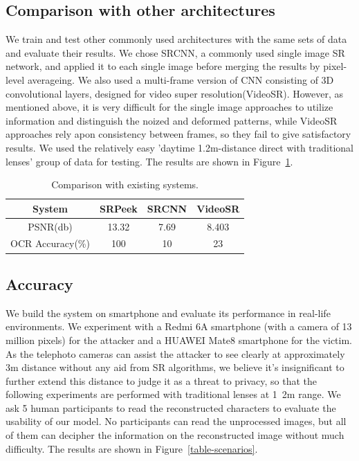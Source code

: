 \subsection{Comparison with other architectures}
We train and test other commonly used architectures with the same sets of data and evaluate their results. We chose SRCNN, a commonly used single image SR network, and applied it to each single image before merging the results by pixel-level averageing. We also used a multi-frame version of CNN consisting of 3D convolutional layers, designed for video super resolution(VideoSR). However, as mentioned above, it is very difficult for the single image approaches to utilize information and distinguish the noized and deformed patterns, while VideoSR approaches rely apon consistency between frames, so they fail to give satisfactory results. We used the relatively easy 'daytime 1.2m-distance direct with traditional lenses' group of data for testing. The results are shown in Figure~\ref{table-comp}.
\begin{table}[!t]
    \centering
    \begin{tabular}{@{}cccc@{}}
        \toprule
    System & SRPeek & SRCNN & VideoSR \\ \midrule
    PSNR(db) & 13.32 & 7.69 & 8.403\\ 
    OCR Accuracy(\%) & 100 & 10 & 23\\ \bottomrule
    \end{tabular}
    \caption{Comparison with existing systems.}
    \label{table-comp}
\end{table}

\subsection{Accuracy}
We build the system on smartphone and evaluate its performance in real-life environments. We experiment with a Redmi 6A smartphone (with a camera of 13 million pixels) for the attacker and a HUAWEI Mate8 smartphone for the victim. As the telephoto cameras can assist the attacker to see clearly at approximately 3m distance without any aid from SR algorithms, we believe it's insignificant to further extend this distance to judge it as a threat to privacy, so that the following experiments are performed with traditional lenses at 1~2m range. We ask 5 human participants to read the reconstructed characters to evaluate the usability of our model. No participants can read the unprocessed images, but all of them can decipher the information on the reconstructed image without much difficulty. The results are shown in Figure~\ref{table-scenarios}.

